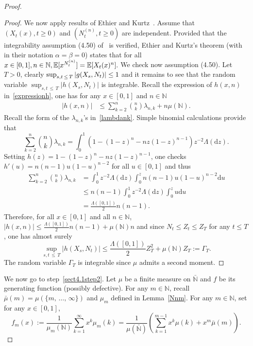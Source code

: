 \documentclass[AHL,Unicode,longabstracts,published]{cedram}
\newcommand{\ddr}{\mathrm{d}}
\newcommand{\bbN}{\mathbb{N}}
\newcommand{\bbE}{\mathbb{E}}
\begin{document}
\begin{proof}
\begin{proof}
We now apply results of Ethier and Kurtz~\cite[Theorem~4.4.11, p.~192]{EthierKurtz}. Assume that $(X_t(x),t\geq 0)$ and $(N_t^{(n)},t\geq 0)$ are independent. Provided that the integrability assumption (4.50) of~\cite[Theorem~4.4.11]{EthierKurtz} is verified, Ethier and Kurtz's theorem (with in their notation $\alpha=\beta=0$) states that for all 
$
x\in [0,1], n\in \bbN, \bbE[x^{N_{t}^{(n)}}]\linebreak=\bbE[X_{t}(x)^{n}].
$
We check now assumption (4.50). Let $T>0$, clearly $\sup_{s,t\,\leq\,T}|g(X_{s},N_{t})|\linebreak\leq 1$ and it remains to see that the random variable $\sup_{s,t\,\leq\,T}|h(X_{s},N_{t})|$ is integrable. Recall the expression of $h(x,n)$ in~\eqref{expressionh}, one has for any $x\in[0,1]$ and $n\in \bbN$
\begin{align*}\label{integralform}
|h(x,n)|&\leq \sum_{k=2}^{n}\binom{n}{k}\lambda_{n,k}+n\mu(\bbN). 
\end{align*}
Recall the form of the $\lambda_{n,k}$'s in~\eqref{lambdank}. Simple binomial calculations provide that
\[
\sum_{k=2}^{n}\binom{n}{k}\lambda_{n,k}=\int_{0}^{1}\left(1-(1-z)^n-nz(1-z)^{n-1}\right)z^{-2}\Lambda(\ddr z).
\]
Setting $h(z)=1-(1-z)^n-nz(1-z)^{n-1}$, one checks $h'(u)=n(n-1)u(1-u)^{n-2}$ for all $u\in [0,1]$ and thus
\begin{align*}
\sum_{k=2}^{n}\binom{n}{k}\lambda_{n,k}&=\int_{0}^{1}z^{-2}\Lambda(\ddr z)\int_{0}^{z}n(n-1)u(1-u)^{n-2}\ddr u\\
&\leq n(n-1)\int_{0}^{1}z^{-2}\Lambda(\ddr z)\int_{0}^{z}u\ddr u\\
&=\frac{\Lambda([0,1])}{2}n(n-1).
\end{align*}
Therefore, for all $x\in [0,1]$ and all $n\in \bbN$, $|h(x,n)|\leq \frac{\Lambda([0,1])}{2}n(n-1)+\mu(\bbN)n$ and since $N_t\leq Z_t\leq Z_T$ for any $t\leq T$, one has almost surely
\[
\sup_{s,t\,\leq\,T}|h(X_{s},N_{t})|\leq \frac{\Lambda([0,1])}{2}Z_T^2+\mu(\bbN)Z_T:=\Gamma_T.
\]
The random variable $\Gamma_T$ is integrable since $\mu$ admits a second moment.
\end{proof}

We now go to step~\eqref{sect4.1step2}. Let $\mu$ be a finite measure on $\bar{\bbN}$ and $f$ be its generating function (possibly defective). For any $m\in \bbN$, recall $\bar{\mu}(m)=\mu(\{m,\,\ldots,\, \infty\})$ and $\mu_m$ defined in Lemma~\ref{Nnm}. For any $m\in \bbN$, set for any $x\in [0,1]$,
\begin{equation}\label{fm}
f_m(x):=\frac{1}{\mu_m(\bbN)}\sum_{k=1}^{\infty}x^{k}\mu_{m}(k)=\frac{1}{\mu(\bar{\bbN})}\left(\sum_{k=1}^{m-1}x^{k}\mu(k)+x^{m}\bar{\mu}(m)\right).
\end{equation}


\end{proof}
\end{document}
